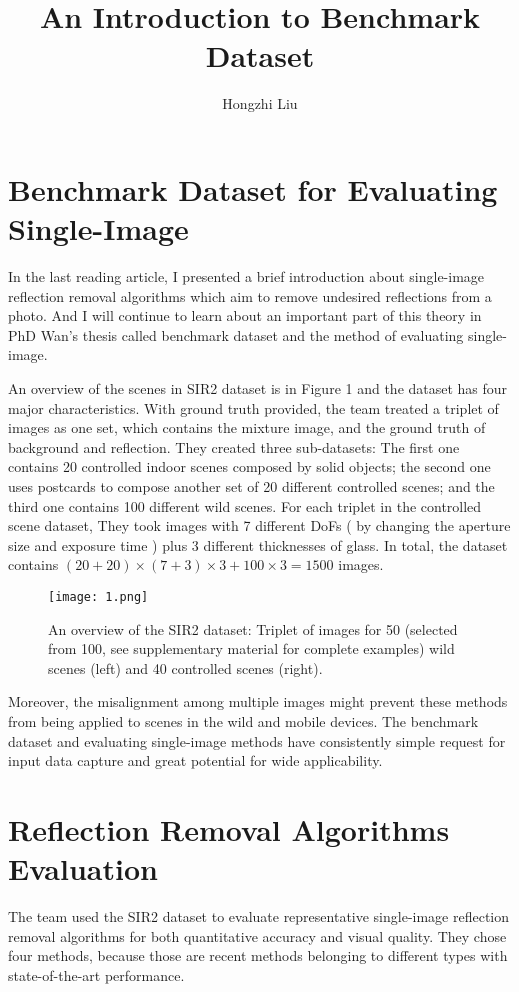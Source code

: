 \documentclass{article}
\author{Hongzhi Liu}
\title{An Introduction to Benchmark Dataset}
\begin{document}
  \maketitle
  \section{Benchmark Dataset for Evaluating Single-Image}
  \par
  In the last reading article, I presented a brief introduction about single-image reflection removal algorithms which aim to remove undesired reflections from a photo. And I will continue to learn about an important part of this theory in PhD Wan's thesis called benchmark dataset and the method of evaluating single-image.

  An overview of the scenes in SIR2 dataset is in Figure 1 and the dataset has four major characteristics. With ground truth provided, the team treated a triplet of images as one set, which contains the mixture image, and the ground truth of background and reflection. They created three sub-datasets: The first one contains 20 controlled indoor scenes composed by solid objects; the second one uses postcards to compose another set of 20 different controlled scenes; and the third one contains 100 different wild scenes. For each triplet in the controlled scene dataset, They took images with 7 different DoFs ( by changing the aperture size and exposure time ) plus 3 different thicknesses of glass. In total, the dataset contains $(20 + 20)\times(7 + 3)\times3 + 100\times3 = 1500$ images.\cite{Wan2017Benchmarking}
\begin{figure}[ht]
\centering
\texttt{[image: 1.png]}
\caption{An overview of the SIR2 dataset: Triplet of images for 50 (selected from 100, see supplementary material for complete examples) wild scenes (left) and 40 controlled scenes (right).}
\end{figure}

  Moreover, the misalignment among multiple images might prevent these methods from being applied to scenes in the wild and mobile devices. The benchmark dataset and evaluating single-image methods have consistently simple request for input data capture and great potential for wide applicability.

  \section{Reflection Removal Algorithms Evaluation}
  \par
  The team used the SIR2 dataset to evaluate representative single-image reflection removal algorithms for both quantitative accuracy and visual quality. They chose four methods, because those are recent methods belonging to different types with state-of-the-art performance.
\end{document}
